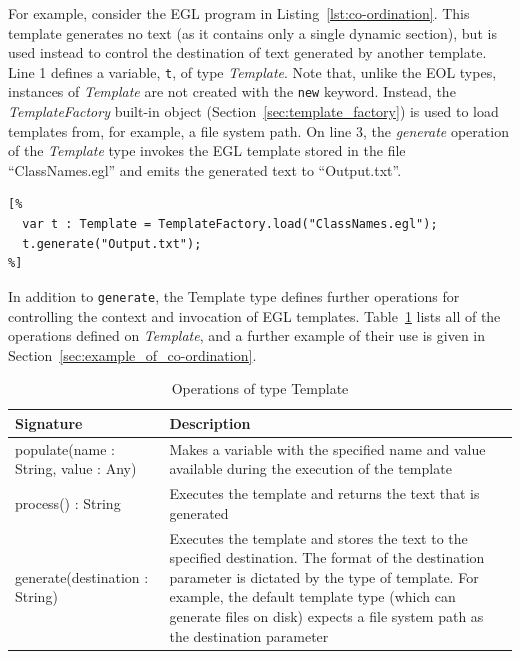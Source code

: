 For example, consider the EGL program in Listing~\ref{lst:co-ordination}.
This template generates no text (as it contains only a single dynamic section),
but is used instead to control the destination of text generated by another
template. Line 1 defines a variable, \texttt{t}, of type \emph{Template}. 
Note that, unlike the EOL types, instances of \emph{Template} are not created
with the \texttt{new} keyword. Instead, the \emph{TemplateFactory} built-in
object (Section~\ref{sec:template_factory}) is used to load templates from, 
for example, a file system path. On line 3, the \emph{generate} operation 
of the \emph{Template} type invokes the EGL template
stored in the file ``ClassNames.egl'' and emits the generated text to 
``Output.txt''.

\begin{lstlisting}[basicstyle=\ttfamily\footnotesize, language=EGL, tabsize=2, flexiblecolumns=true, caption=Storing the name of each Class to disk., label=lst:co-ordination]
[%
  var t : Template = TemplateFactory.load("ClassNames.egl");
  t.generate("Output.txt");
%]
\end{lstlisting}

In addition to \texttt{generate}, the Template type defines further operations for controlling the context and invocation of EGL templates. Table~\ref{tab:TemplateOperations} lists all of the operations defined on \emph{Template}, and a further example of their use is given in Section~\ref{sec:example_of_co-ordination}.

\begin{longtable} {|p{5.5cm}|p{6.5cm}|}
			
			\caption{Operations of type Template}
			\label{tab:TemplateOperations}\\
			
			\hline
							
			\textbf{Signature} & \textbf{Description} \\\hline
			
			populate(name : String, value : Any) & Makes a variable with the specified name and value available during the execution of the template \\\hline
			
			process() : String & Executes the template and returns the text that is generated  \\\hline
			
			generate(destination : String) & Executes the template and stores the text to the specified destination. The format of the destination parameter is dictated by the type of template. For example, the default template type (which can generate files on disk) expects a file system path as the destination parameter \\\hline
\end{longtable}



